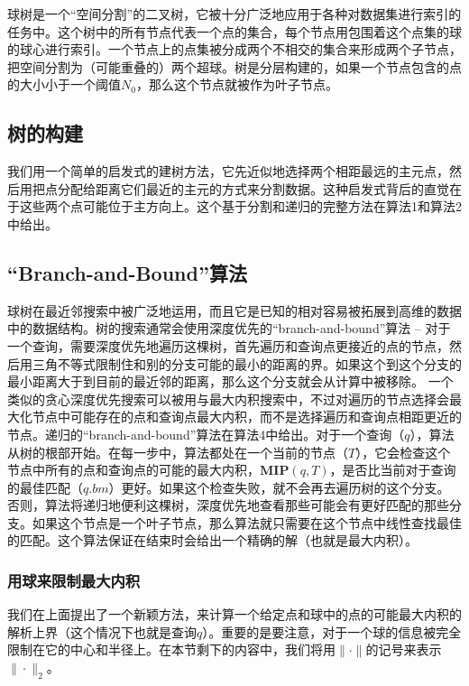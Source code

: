 \documentclass[twocolumn,a4paper]{article}
\begin{document}
球树是一个“空间分割”的二叉树，它被十分广泛地应用于各种对数据集进行索引的任务中。这个树中的所有节点代表一个点的集合，每个节点用包围着这个点集的球的球心进行索引。一个节点上的点集被分成两个不相交的集合来形成两个子节点，把空间分割为（可能重叠的）两个超球。树是分层构建的，如果一个节点包含的点的大小小于一个阈值$N_0$，那么这个节点就被作为叶子节点。

\subsection{树的构建}

我们用一个简单的启发式的建树方法，它先近似地选择两个相距最远的主元点，然后用把点分配给距离它们最近的主元的方式来分割数据。这种启发式背后的直觉在于这些两个点可能位于主方向上。这个基于分割和递归的完整方法在算法1和算法2中给出。

\subsection{“Branch-and-Bound”算法}

球树在最近邻搜索中被广泛地运用，而且它是已知的相对容易被拓展到高维的数据中的数据结构。树的搜索通常会使用深度优先的“branch-and-bound”算法 -- 对于一个查询，需要深度优先地遍历这棵树，首先遍历和查询点更接近的点的节点，然后用三角不等式限制住和别的分支可能的最小的距离的界。如果这个到这个分支的最小距离大于到目前的最近邻的距离，那么这个分支就会从计算中被移除。
一个类似的贪心深度优先搜索可以被用与最大内积搜索中，不过对遍历的节点选择会最大化节点中可能存在的点和查询点最大内积，而不是选择遍历和查询点相距更近的节点。递归的“branch-and-bound”算法在算法4中给出。对于一个查询（$q$），算法从树的根部开始。在每一步中，算法都处在一个当前的节点（$T$），它会检查这个节点中所有的点和查询点的可能的最大内积，$\mathbf{MIP}(q,T)$，是否比当前对于查询的最佳匹配（$q.bm$）更好。如果这个检查失败，就不会再去遍历树的这个分支。否则，算法将递归地便利这棵树，深度优先地查看那些可能会有更好匹配的那些分支。如果这个节点是一个叶子节点，那么算法就只需要在这个节点中线性查找最佳的匹配。这个算法保证在结束时会给出一个精确的解（也就是最大内积）。

\subsubsection{用球来限制最大内积}

我们在上面提出了一个新颖方法，来计算一个给定点和球中的点的可能最大内积的解析上界（这个情况下也就是查询$q$）。重要的是要注意，对于一个球的信息被完全限制在它的中心和半径上。在本节剩下的内容中，我们将用$\|\cdot\|$的记号来表示$\|\cdot\|_2$。
\end{document}
